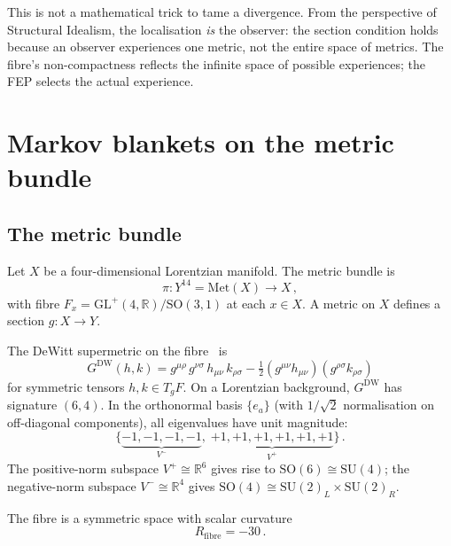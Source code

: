 \documentclass[12pt, a4paper]{article}
\theoremstyle{definition}
\theoremstyle{remark}
\newcommand{\R}{\mathbb{R}}
\newcommand{\Met}{\mathrm{Met}}
\newcommand{\SU}{\mathrm{SU}}
\newcommand{\SO}{\mathrm{SO}}
\newcommand{\GL}{\mathrm{GL}}
\newcommand{\Rfibre}{R_{\mathrm{fibre}}}
\begin{document}
This is not a mathematical trick to tame a divergence.
From the perspective of Structural Idealism, the localisation \emph{is} the observer: the section condition holds because an observer experiences one metric, not the entire space of metrics.
The fibre's non-compactness reflects the infinite space of possible experiences; the FEP selects the actual experience.


\section{Markov blankets on the metric bundle}
\label{sec:blankets}

\subsection{The metric bundle}

Let $X$ be a four-dimensional Lorentzian manifold.
The metric bundle is
\begin{equation}
\pi: Y^{14} = \Met(X) \to X\,,
\end{equation}
with fibre $F_x = \GL^+(4,\R)/\SO(3,1)$ at each $x \in X$.
A metric on $X$ defines a section $g: X \to Y$.

The DeWitt supermetric on the fibre~\cite{DeWitt1967,Giulini2009} is
\begin{equation}
\label{eq:dewitt}
G^{\mathrm{DW}}(h,k) = g^{\mu\rho}\, g^{\nu\sigma}\, h_{\mu\nu}\, k_{\rho\sigma} - \tfrac{1}{2}\left(g^{\mu\nu} h_{\mu\nu}\right)\left(g^{\rho\sigma} k_{\rho\sigma}\right)
\end{equation}
for symmetric tensors $h, k \in T_g F$.
On a Lorentzian background, $G^{\mathrm{DW}}$ has signature $(6,4)$.
In the orthonormal basis $\{e_a\}$ (with $1/\sqrt{2}$ normalisation on off-diagonal components), all eigenvalues have unit magnitude:
\begin{equation}
\label{eq:eigenvalues}
\{\underbrace{-1, -1, -1, -1}_{V^-},\; \underbrace{+1, +1, +1, +1, +1, +1}_{V^+}\}\,.
\end{equation}
The positive-norm subspace $V^+ \cong \R^6$ gives rise to $\SO(6) \cong \SU(4)$; the negative-norm subspace $V^- \cong \R^4$ gives $\SO(4) \cong \SU(2)_L \times \SU(2)_R$.

The fibre is a symmetric space with scalar curvature~\cite{Paper1}
\begin{equation}
\label{eq:R_fibre}
\Rfibre = -30\,.
\end{equation}
\end{document}
